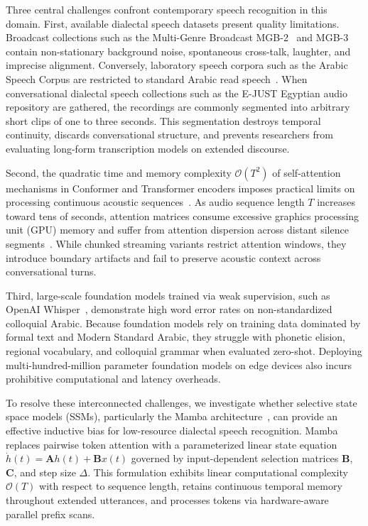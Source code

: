 \documentclass[journal]{IEEEtran}
\begin{document}
Three central challenges confront contemporary speech recognition in this domain. First, available dialectal speech datasets present quality limitations. Broadcast collections such as the Multi-Genre Broadcast MGB-2~\cite{ali2016mgb2} and MGB-3~\cite{ali2017mgb3} contain non-stationary background noise, spontaneous cross-talk, laughter, and imprecise alignment. Conversely, laboratory speech corpora such as the Arabic Speech Corpus are restricted to standard Arabic read speech~\cite{alhaj2018acoustic}. When conversational dialectal speech collections such as the E-JUST Egyptian audio repository are gathered, the recordings are commonly segmented into arbitrary short clips of one to three seconds. This segmentation destroys temporal continuity, discards conversational structure, and prevents researchers from evaluating long-form transcription models on extended discourse.

Second, the quadratic time and memory complexity $\mathcal{O}(T^2)$ of self-attention mechanisms in Conformer and Transformer encoders imposes practical limits on processing continuous acoustic sequences~\cite{gulati2020conformer,vaswani2017attention}. As audio sequence length $T$ increases toward tens of seconds, attention matrices consume excessive graphics processing unit (GPU) memory and suffer from attention dispersion across distant silence segments~\cite{zhang2020streaming,shi2021emformer}. While chunked streaming variants restrict attention windows, they introduce boundary artifacts and fail to preserve acoustic context across conversational turns.

Third, large-scale foundation models trained via weak supervision, such as OpenAI Whisper~\cite{radford2023whisper}, demonstrate high word error rates on non-standardized colloquial Arabic. Because foundation models rely on training data dominated by formal text and Modern Standard Arabic, they struggle with phonetic elision, regional vocabulary, and colloquial grammar when evaluated zero-shot. Deploying multi-hundred-million parameter foundation models on edge devices also incurs prohibitive computational and latency overheads.

To resolve these interconnected challenges, we investigate whether selective state space models (SSMs), particularly the Mamba architecture~\cite{gu2023mamba}, can provide an effective inductive bias for low-resource dialectal speech recognition. Mamba replaces pairwise token attention with a parameterized linear state equation $\dot{h}(t) = \mathbf{A}h(t) + \mathbf{B}x(t)$ governed by input-dependent selection matrices $\mathbf{B}$, $\mathbf{C}$, and step size $\Delta$. This formulation exhibits linear computational complexity $\mathcal{O}(T)$ with respect to sequence length, retains continuous temporal memory throughout extended utterances, and processes tokens via hardware-aware parallel prefix scans.
\end{document}
